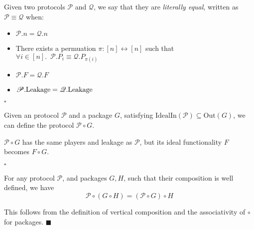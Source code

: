 \begin{definition}
Given two protocols $\mathscr{P}$ and $\mathscr{Q}$, we say that
they are \emph{literally equal}, written as $\mathscr{P} \equiv \mathscr{Q}$
when:
\begin{itemize}
\item $\mathscr{P}.n = \mathscr{Q}.n$
\item There exists a permuation $\pi : [n] \leftrightarrow [n]$ such that
$
{\forall i \in [n].\enspace \mathscr{P}.P_i \equiv \mathscr{Q}.P_{\pi(i)}}
$
\item $\mathscr{P}.F = \mathscr{Q}.F$
\item $\mathscr{P}.\text{Leakage} = \mathscr{Q}.\text{Leakage}$
\end{itemize}

$\square$
\end{definition}

\begin{definition}
Given an protocol $\mathscr{P}$ and a package $G$, satisfying
$\text{IdealIn}(\mathscr{P}) \subseteq \text{Out}(G)$,
we can define the protocol $\mathscr{P} \circ G$.

$\mathscr{P} \circ G$ has the same players and leakage as $\mathscr{P}$,
but its ideal functionality $F$ becomes $F \circ G$.

$\square$
\end{definition}

\begin{claim}
For any protocol $\mathscr{P}$, and packages $G, H$, such that their composition
is well defined, we have
$$
\mathscr{P} \circ (G \circ H) = (\mathscr{P} \circ G) \circ H
$$

 This follows from the definition of vertical composition
and the associativity of $\circ$ for packages.
$\blacksquare$
\end{claim}

